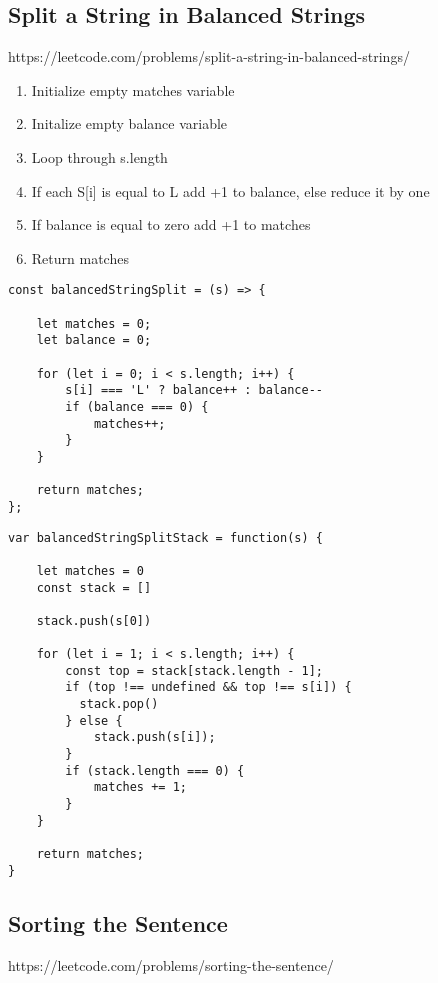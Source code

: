 \documentclass[10pt]{article}
\begin{document}
\pagebreak %
\medskip 
\subsection{Split a String in Balanced Strings}
https://leetcode.com/problems/split-a-string-in-balanced-strings/

\begin{enumerate}
	\item Initialize empty matches variable
	\item Initalize empty balance variable
	\item Loop through s.length
	\item If each S[i] is equal to L add +1 to balance, else reduce it by one
	\item If balance is equal to zero add +1 to matches 
	\item Return matches 
\end{enumerate}

\begin{lstlisting}[title=Solution balancedStringSplit with balance counter, captionpos=t]
const balancedStringSplit = (s) => {
    
    let matches = 0;
    let balance = 0;

    for (let i = 0; i < s.length; i++) {
        s[i] === 'L' ? balance++ : balance--
        if (balance === 0) {
            matches++;
        }
    }

    return matches;
};
\end{lstlisting}

\begin{lstlisting}[title=Solution balancedStringSplit with stack, captionpos=t]
var balancedStringSplitStack = function(s) {

    let matches = 0
    const stack = []

    stack.push(s[0])

    for (let i = 1; i < s.length; i++) {
        const top = stack[stack.length - 1];
        if (top !== undefined && top !== s[i]) {
          stack.pop()
        } else {
            stack.push(s[i]);
        }
        if (stack.length === 0) {
            matches += 1;
        }
    }

    return matches;
}
\end{lstlisting}
\medskip %



\pagebreak %
\medskip 
\subsection{Sorting the Sentence}
https://leetcode.com/problems/sorting-the-sentence/
\end{document}
